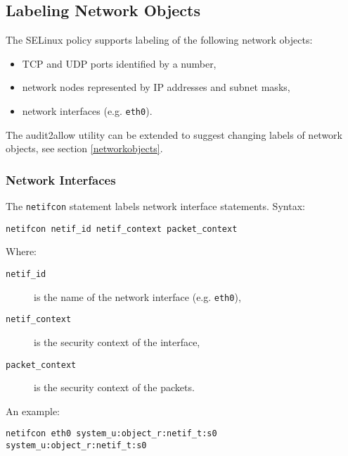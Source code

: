 \subsection{Labeling Network Objects}

The SELinux policy supports labeling of the following network objects:
\begin{itemize}
    \item TCP and UDP ports identified by a number,
    \item network nodes represented by IP addresses and subnet masks,
    \item network interfaces (e.g. \texttt{eth0}).
\end{itemize}
The audit2allow utility can be extended to suggest changing labels of network
objects, see section \ref{networkobjects}.

\subsubsection{Network Interfaces}
The \texttt{netifcon} statement labels network interface statements. Syntax:
\begin{lstlisting}[language=te]
netifcon netif_id netif_context packet_context
\end{lstlisting}
Where:
\begin{description}
    \item [\texttt{netif\_id}] is the name of the network interface (e.g.
        \texttt{eth0}),
    \item [\texttt{netif\_context}] is the security context of the interface,
    \item [\texttt{packet\_context}] is the security context of the packets.
\end{description}
An example:
\begin{lstlisting}[language=te]
netifcon eth0 system_u:object_r:netif_t:s0 system_u:object_r:netif_t:s0
\end{lstlisting}

